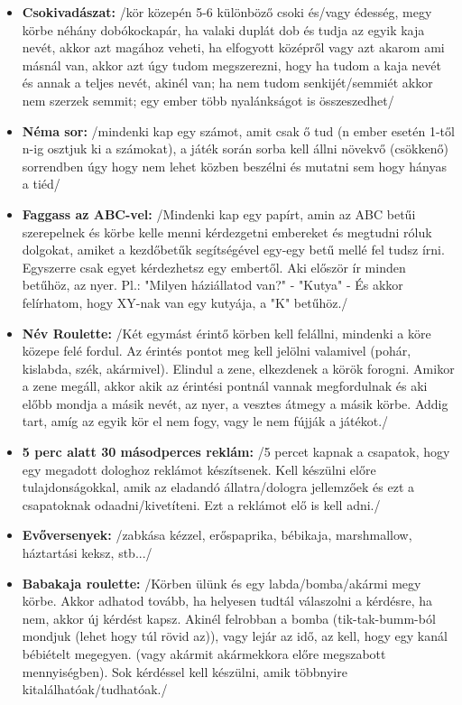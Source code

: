 \documentclass[a4paper, 12pt, twoside, openright]{article}
\begin{document}
\begin{itemize}
\item \textbf{Csokivadászat:} /kör közepén 5-6 különböző csoki és/vagy édesség, megy körbe néhány dobókockapár, ha valaki duplát dob és tudja az egyik kaja nevét, akkor azt magához veheti, ha elfogyott középről vagy azt akarom ami másnál van, akkor azt úgy tudom megszerezni, hogy ha tudom a kaja nevét és annak a teljes nevét, akinél van; ha nem tudom senkijét/semmiét akkor nem szerzek semmit; egy ember több nyalánkságot is összeszedhet/

\item \textbf{Néma sor:} /mindenki kap egy számot, amit csak ő tud (n ember esetén 1-től n-ig osztjuk ki a számokat), a játék során sorba kell állni növekvő (csökkenő) sorrendben úgy hogy nem lehet közben beszélni és mutatni sem hogy hányas a tiéd/

\item \textbf{Faggass az ABC-vel:} /Mindenki kap egy papírt, amin az ABC betűi szerepelnek és körbe kelle menni kérdezgetni embereket és megtudni róluk dolgokat, amiket a kezdőbetűk segítségével egy-egy betű mellé fel tudsz írni. Egyszerre csak egyet kérdezhetsz egy embertől. Aki először ír minden betűhöz, az nyer. Pl.: "Milyen háziállatod van?" - "Kutya" - És akkor felírhatom, hogy XY-nak van egy kutyája, a "K" betűhöz./

\item \textbf{Név Roulette:} /Két egymást érintő körben kell felállni, mindenki a köre közepe felé fordul. Az érintés pontot meg kell jelölni valamivel (pohár, kislabda, szék, akármivel). Elindul a zene, elkezdenek a körök forogni. Amikor a zene megáll, akkor akik az érintési pontnál vannak megfordulnak és aki előbb mondja a másik nevét, az nyer, a vesztes átmegy a másik körbe. Addig tart, amíg az egyik kör el nem fogy, vagy le nem fújják a játékot./

\item \textbf{5 perc alatt 30 másodperces reklám:} /5 percet kapnak a csapatok, hogy egy megadott dologhoz reklámot készítsenek. Kell készülni előre tulajdonságokkal, amik az eladandó állatra/dologra jellemzőek és ezt a csapatoknak odaadni/kivetíteni. Ezt a reklámot elő is kell adni./

\item \textbf{Evőversenyek:} /zabkása kézzel, erőspaprika, bébikaja, marshmallow, háztartási keksz, stb.../

\item \textbf{Babakaja roulette:} /Körben ülünk és egy labda/bomba/akármi megy körbe. Akkor adhatod tovább, ha helyesen tudtál válaszolni a kérdésre, ha nem, akkor új kérdést kapsz. Akinél felrobban a bomba (tik-tak-bumm-ból mondjuk (lehet hogy túl rövid az)), vagy lejár az idő, az kell, hogy egy kanál bébiételt megegyen. (vagy akármit akármekkora előre megszabott mennyiségben). Sok kérdéssel kell készülni, amik többnyire kitalálhatóak/tudhatóak./


\end{itemize}
\end{document}
